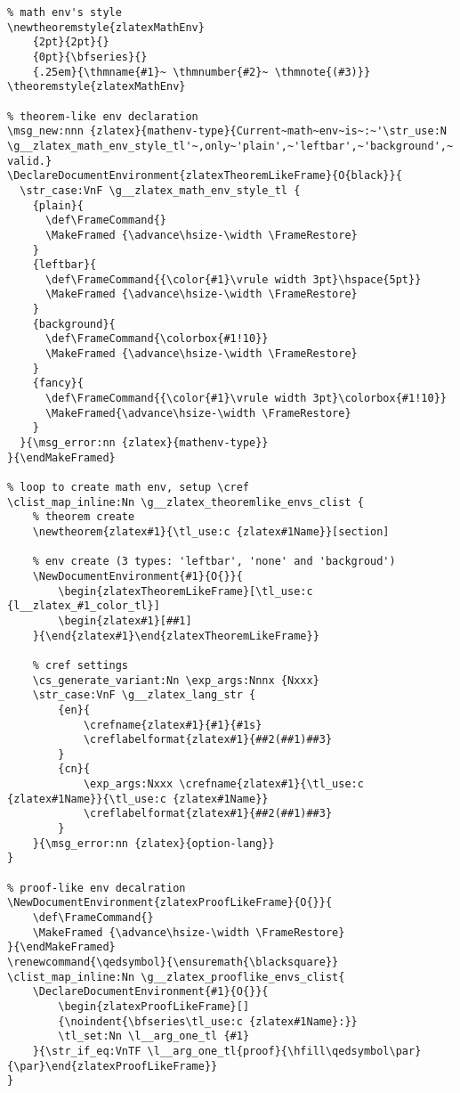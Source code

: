 \begin{verbatim}
% math env's style
\newtheoremstyle{zlatexMathEnv}
    {2pt}{2pt}{}
    {0pt}{\bfseries}{}
    {.25em}{\thmname{#1}~ \thmnumber{#2}~ \thmnote{(#3)}}
\theoremstyle{zlatexMathEnv}

% theorem-like env declaration
\msg_new:nnn {zlatex}{mathenv-type}{Current~math~env~is~:~'\str_use:N \g__zlatex_math_env_style_tl'~,only~'plain',~'leftbar',~'background',~'fancy'~types~are-valid.}
\DeclareDocumentEnvironment{zlatexTheoremLikeFrame}{O{black}}{
  \str_case:VnF \g__zlatex_math_env_style_tl {
    {plain}{  
      \def\FrameCommand{}
      \MakeFramed {\advance\hsize-\width \FrameRestore}
    }
    {leftbar}{
      \def\FrameCommand{{\color{#1}\vrule width 3pt}\hspace{5pt}}
      \MakeFramed {\advance\hsize-\width \FrameRestore}
    }
    {background}{
      \def\FrameCommand{\colorbox{#1!10}}
      \MakeFramed {\advance\hsize-\width \FrameRestore}
    }
    {fancy}{
      \def\FrameCommand{{\color{#1}\vrule width 3pt}\colorbox{#1!10}}
      \MakeFramed{\advance\hsize-\width \FrameRestore}
    }
  }{\msg_error:nn {zlatex}{mathenv-type}}
}{\endMakeFramed}

% loop to create math env, setup \cref
\clist_map_inline:Nn \g__zlatex_theoremlike_envs_clist {
    % theorem create
    \newtheorem{zlatex#1}{\tl_use:c {zlatex#1Name}}[section]

    % env create (3 types: 'leftbar', 'none' and 'backgroud')
    \NewDocumentEnvironment{#1}{O{}}{
        \begin{zlatexTheoremLikeFrame}[\tl_use:c {l__zlatex_#1_color_tl}]
        \begin{zlatex#1}[##1]
    }{\end{zlatex#1}\end{zlatexTheoremLikeFrame}}

    % cref settings
    \cs_generate_variant:Nn \exp_args:Nnnx {Nxxx}
    \str_case:VnF \g__zlatex_lang_str {
        {en}{
            \crefname{zlatex#1}{#1}{#1s}
            \creflabelformat{zlatex#1}{##2(##1)##3}
        }
        {cn}{
            \exp_args:Nxxx \crefname{zlatex#1}{\tl_use:c {zlatex#1Name}}{\tl_use:c {zlatex#1Name}}
            \creflabelformat{zlatex#1}{##2(##1)##3}
        }
    }{\msg_error:nn {zlatex}{option-lang}}
}

% proof-like env decalration
\NewDocumentEnvironment{zlatexProofLikeFrame}{O{}}{
    \def\FrameCommand{}
    \MakeFramed {\advance\hsize-\width \FrameRestore}
}{\endMakeFramed}
\renewcommand{\qedsymbol}{\ensuremath{\blacksquare}}
\clist_map_inline:Nn \g__zlatex_prooflike_envs_clist{
    \DeclareDocumentEnvironment{#1}{O{}}{
        \begin{zlatexProofLikeFrame}[]
        {\noindent{\bfseries\tl_use:c {zlatex#1Name}:}}
        \tl_set:Nn \l__arg_one_tl {#1}
    }{\str_if_eq:VnTF \l__arg_one_tl{proof}{\hfill\qedsymbol\par}{\par}\end{zlatexProofLikeFrame}}
}
\end{verbatim}

